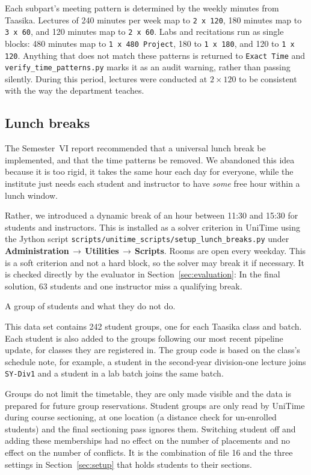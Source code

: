 Each subpart's meeting pattern is determined by the weekly minutes from Taasika.
Lectures of 240 minutes per week map to \texttt{2 x 120}, 180 minutes map to \texttt{3 x 60}, and 120 minutes map to \texttt{2 x 60}.
Labs and recitations run as single blocks: 480 minutes map to \texttt{1 x 480 Project}, 180 to \texttt{1 x 180}, and 120 to \texttt{1 x 120}.
Anything that does not match these patterns is returned to \texttt{Exact Time} and \texttt{verify\_time\_patterns.py} marks it as an audit warning, rather than passing silently.
During this period, lectures were conducted at $2\times120$ to be consistent with the way the department teaches.

\subsection{Lunch breaks}

The Semester~VI report recommended that a universal lunch break be implemented, and that the time patterns be removed.
We abandoned this idea because it is too rigid, it takes the same hour each day for everyone, while the institute just needs each student and instructor to have \emph{some} free hour within a lunch window.

Rather, we introduced a dynamic break of an hour between 11:30 and 15:30 for students and instructors.
This is installed as a solver criterion in UniTime using the Jython script \texttt{scripts/unitime\_scripts/setup\_lunch\_breaks.py} under \textbf{Administration\,$\rightarrow$\,Utilities\,$\rightarrow$\,Scripts}.
Rooms are open every weekday.
This is a soft criterion and not a hard block, so the solver may break it if necessary.
It is checked directly by the evaluator in Section~\ref{sec:evaluation}: In the final solution, 63 students and one instructor miss a qualifying break.

A group of students and what they do not do.

This data set contains 242 student groups, one for each Taasika class and batch.
Each student is also added to the groups following our most recent pipeline update, for classes they are registered in.
The group code is based on the class's schedule note, for example, a student in the second-year division-one lecture joins \texttt{SY-Div1} and a student in a lab batch joins the same batch.

Groups do not limit the timetable, they are only made visible and the data is prepared for future group reservations.
Student groups are only read by UniTime during course sectioning, at one location (a distance check for un-enrolled students) and the final sectioning pass ignores them.
Switching student off and adding these memberships had no effect on the number of placements and no effect on the number of conflicts.
It is the combination of file 16 and the three settings in Section~\ref{sec:setup} that holds students to their sections.

